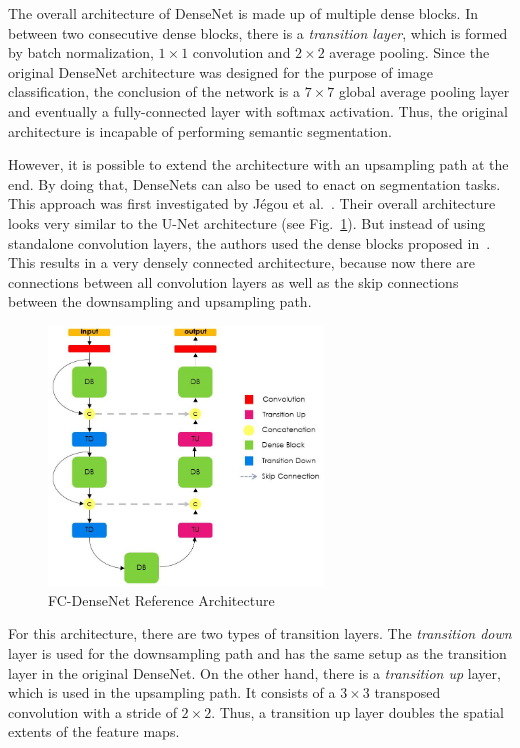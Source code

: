 The overall architecture of DenseNet is made up of multiple dense blocks. In between two consecutive dense blocks, there is a \emph{transition layer}, which is formed by batch normalization, $1\times 1$ convolution and $2\times 2$ average pooling. Since the original DenseNet architecture was designed for the purpose of image classification, the conclusion of the network is a $7\times 7$ global average pooling layer and eventually a fully-connected layer with softmax activation. Thus, the original architecture is incapable of performing semantic segmentation.

However, it is possible to extend the architecture with an upsampling path at the end. By doing that, DenseNets can also be used to enact on segmentation tasks. This approach was first investigated by Jégou et al.~\cite{denseseg17}. Their overall architecture looks very similar to the U-Net architecture (see Fig.~\ref{fig:densenet_segmentation}). But instead of using standalone convolution layers, the authors used the dense blocks proposed in~\cite{densenet18}. This results in a very densely connected architecture, because now there are connections between all convolution layers as well as the skip connections between the downsampling and upsampling path.

\begin{figure}[h]
    \centering
    \includegraphics[width=0.65\textwidth]{images/dense_segmentation_architecture}
    \caption[FC-DenseNet Reference Architecture]{FC-DenseNet Reference Architecture~\cite{denseseg17}}
    \label{fig:densenet_segmentation}
\end{figure}

For this architecture, there are two types of transition layers. The \emph{transition down} layer is used for the downsampling path and has the same setup as the transition layer in the original DenseNet. On the other hand, there is a \emph{transition up} layer, which is used in the upsampling path. It consists of a $3\times 3$ transposed convolution with a stride of $2\times 2$. Thus, a transition up layer doubles the spatial extents of the feature maps.

